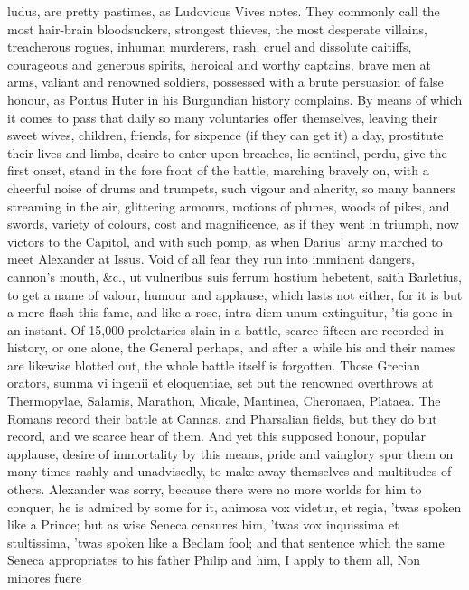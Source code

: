 {ludus, are pretty pastimes, as Ludovicus Vives notes. They
commonly call the most hair-brain bloodsuckers, strongest thieves, the
most desperate villains, treacherous rogues, inhuman murderers, rash,
cruel and dissolute caitiffs, courageous and generous spirits, heroical
and worthy captains, brave men at arms, valiant and renowned
soldiers, possessed with a brute persuasion of false honour, as Pontus
Huter in his Burgundian history complains. By means of which it comes
to pass that daily so many voluntaries offer themselves, leaving their
sweet wives, children, friends, for sixpence (if they can get it) a
day, prostitute their lives and limbs, desire to enter upon breaches,
lie sentinel, perdu, give the first onset, stand in the fore front of
the battle, marching bravely on, with a cheerful noise of drums and
trumpets, such vigour and alacrity, so many banners streaming in the
air, glittering armours, motions of plumes, woods of pikes, and swords,
variety of colours, cost and magnificence, as if they went in triumph,
now victors to the Capitol, and with such pomp, as when Darius' army
marched to meet Alexander at Issus. Void of all fear they run into
imminent dangers, cannon's mouth, \&c., ut vulneribus suis ferrum
hostium hebetent, saith Barletius, to get a name of valour, humour
and applause, which lasts not either, for it is but a mere flash this
fame, and like a rose, intra diem unum extinguitur, 'tis gone in an
instant. Of 15,000 proletaries slain in a battle, scarce fifteen are
recorded in history, or one alone, the General perhaps, and after a
while his and their names are likewise blotted out, the whole battle
itself is forgotten. Those Grecian orators, summa vi ingenii et
eloquentiae, set out the renowned overthrows at Thermopylae, Salamis,
Marathon, Micale, Mantinea, Cheronaea, Plataea. The Romans record their
battle at Cannas, and Pharsalian fields, but they do but record, and we
scarce hear of them. And yet this supposed honour, popular applause,
desire of immortality by this means, pride and vainglory spur them on
many times rashly and unadvisedly, to make away themselves and
multitudes of others. Alexander was sorry, because there were no more
worlds for him to conquer, he is admired by some for it, animosa vox
videtur, et regia, 'twas spoken like a Prince; but as wise Seneca
censures him, 'twas vox inquissima et stultissima, 'twas spoken like a
Bedlam fool; and that sentence which the same Seneca appropriates
to his father Philip and him, I apply to them all, Non minores fuere
}

